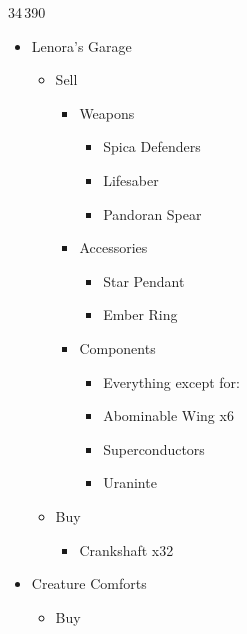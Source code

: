\begin{multicols}{2}
  \begin{shop}{34\,390}
    \begin{itemize}
      \item Lenora's Garage
            \begin{itemize}
              \item Sell
                    \begin{itemize}
                      \item Weapons
                            \begin{itemize}
                              \item Spica Defenders
                              \item Lifesaber
                              \item Pandoran Spear
                            \end{itemize}
                      \item Accessories
                            \begin{itemize}
                              \item Star Pendant
                              \item Ember Ring
                            \end{itemize}
                      \item Components
                            \begin{itemize}
                              \item Everything except for:
                              \item Abominable Wing x6
                              \item Superconductors
                              \item Uraninte
                            \end{itemize}
                    \end{itemize}
              \item Buy
                    \begin{itemize}
                      \item Crankshaft x32
                    \end{itemize}
            \end{itemize}
      \item Creature Comforts
            \begin{itemize}
              \item Buy
                    \begin{itemize}

\end{itemize}
\end{itemize}
\end{itemize}
\end{shop}
\end{multicols}
